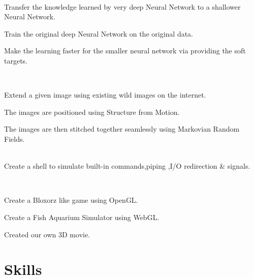 \documentclass[]{resume-openfont}
\begin{document}
 \\
\begin{tightemize}
    \item Transfer the knowledge learned by very deep Neural Network to a shallower Neural Network.
    \item Train the original deep Neural Network on the original data.
    \item Make the learning faster for the smaller neural network via providing the soft targets.
\end{tightemize}
\sectionsep

\\
\begin{tightemize}
    \item Extend a given image using existing wild images on the internet.
    \item The images are positioned using Structure from Motion.
    \item The images are then stitched together seamlessly using Markovian Random Fields.
\end{tightemize}
 
\sectionsep

\\

Create a shell to simulate built-in commands,piping ,I/O redirection \& signals.
\sectionsep

\\
\begin{tightemize}
    \item Create a Bloxorz like game using OpenGL.
    \item Create a Fish Aquarium Simulator using WebGL.
    \item Created our own 3D movie.
\end{tightemize}
\sectionsep


\section{Skills}
\begin{resumeSkillList}
    \\
    \\
\end{resumeSkillList}
\end{document}
